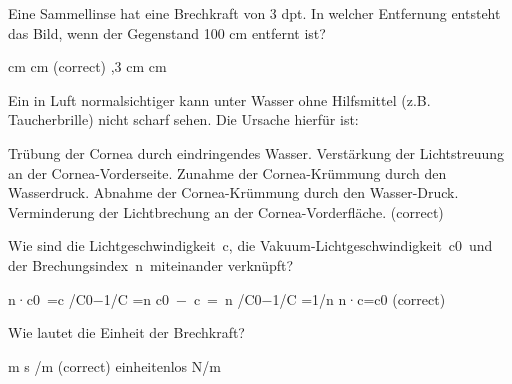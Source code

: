 \documentclass[11pt]{exam}
\begin{document}
\setlength{\voffset}{-0.5in}
\setlength{\headsep}{5pt}

\hspace{2mm}
 \hspace{5mm}
\vspace{4mm}

\begin{questions}

\question Eine Sammellinse hat eine Brechkraft von 3 dpt. In welcher Entfernung entsteht das Bild, wenn der Gegenstand 100 cm entfernt ist?

\begin{choices}
	 cm
	 cm (correct)
	,3 cm
	\choice 150cm
	 cm
\end{choices}

\vspace{3mm}\question Ein in Luft normalsichtiger kann unter Wasser ohne Hilfsmittel (z.B. Taucherbrille) nicht scharf sehen. Die Ursache hierfür ist:

\begin{choices}
	\choice Trübung der Cornea durch eindringendes Wasser.
	\choice Verstärkung der Lichtstreuung an der Cornea-Vorderseite.
	\choice Zunahme der Cornea-Krümmung durch den Wasserdruck.
	\choice Abnahme der Cornea-Krümmung durch den Wasser-Druck.
	\choice Verminderung der Lichtbrechung an der Cornea-Vorderfläche. (correct)
\end{choices}

\vspace{3mm}\question Wie sind die Lichtgeschwindigkeit c, die Vakuum-Lichtgeschwindigkeit c0 und der Brechungsindex n miteinander verknüpft?

\begin{choices}
	\choice n·c0 =c
	 /C0−1/C =n
	\choice c0 − c = n
	 /C0−1/C =1/n
	\choice n·c=c0 (correct)
\end{choices}

\vspace{3mm}\question Wie lautet die Einheit der Brechkraft?

\begin{choices}
	\choice m
	\choice s
	/m (correct)
	\choice einheitenlos
	\choice N/m
\end{choices}


\end{questions}
\end{document}
